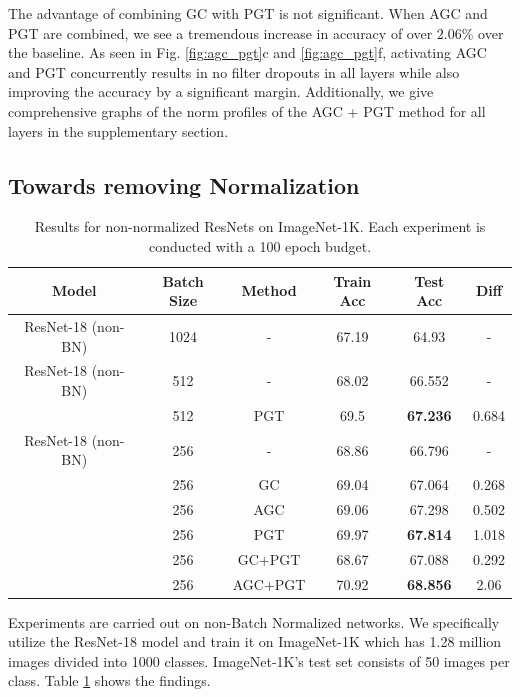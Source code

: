\documentclass[times,sort&compress]{elsarticle}
\begin{document}
The advantage of combining GC with PGT is not significant. When AGC and PGT are
combined, we see a tremendous increase in accuracy of over $2.06\%$ over the baseline.
As seen in Fig. \ref{fig:agc_pgt}c and \ref{fig:agc_pgt}f, activating AGC and PGT
concurrently results in no filter dropouts in all layers while also improving the
accuracy by a significant margin. Additionally, we give comprehensive graphs of the norm
profiles of the AGC + PGT method for all layers in the supplementary section.


\subsection{Towards removing Normalization}
\label{sec:Towa}



\begin{table}[t]
\centering
\caption{ Results for non-normalized ResNets on ImageNet-1K. Each experiment is
conducted with a 100 epoch budget. }
\label{tab:wobn_table}
\vspace{5pt}
\begin{tabular}{cccccc}
\textbf{Model} & \textbf{Batch Size} & \textbf{Method} & \textbf{Train Acc} &
\textbf{Test Acc} & \textbf{Diff} \\
\midrule
ResNet-18 (non-BN) & 1024 & - & 67.19 & 64.93 & - \\
\midrule
ResNet-18 (non-BN) & 512 & - & 68.02 & 66.552 & - \\
& 512 & PGT & 69.5 & \textbf{67.236} & 0.684 \\
\midrule
ResNet-18 (non-BN) & 256 & - & 68.86 & 66.796 & - \\
& 256 & GC & 69.04 & 67.064 & 0.268 \\
& 256 & AGC & 69.06 & 67.298 & 0.502 \\
& 256 & PGT & 69.97 & \textbf{67.814} & 1.018 \\
& 256 & GC+PGT & 68.67 & 67.088 & 0.292 \\
& 256 & AGC+PGT & 70.92 & \textbf{68.856} & 2.06 \\
\end{tabular}
\end{table}









Experiments are carried out on non-Batch Normalized networks. We specifically utilize
the ResNet-18 model and train it on ImageNet-1K which has 1.28 million images divided
into 1000 classes. ImageNet-1K's test set consists of 50 images per class. Table
\ref{tab:wobn_table} shows the findings.
\end{document}
